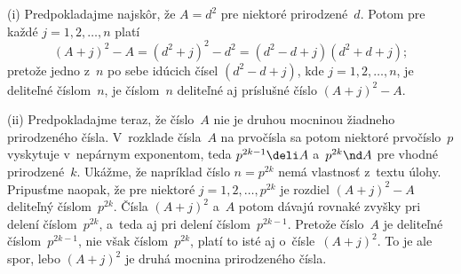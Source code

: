 {%
(i) Predpokladajme najskôr, že $A=d^2$ pre niektoré
prirodzené~$d$. Potom pre každé $j=1,2,\dots,n$ platí
$$
(A+j)^2-A=(d^2+j)^2-d^2=(d^2-d+j)(d^2+d+j);
$$
pretože jedno z~$n$ po sebe idúcich čísel $(d^2-d+j)$, kde
$j=1,2,\dots,n$, je deliteľné číslom~$n$, je číslom~$n$
deliteľné aj príslušné číslo $(A+j)^2-A$.

\smallskip
(ii) Predpokladajme teraz, že číslo~$A$ nie je druhou mocninou
žiadneho prirodzeného čísla. V~rozklade čísla~$A$ na prvočísla
sa potom niektoré prvočíslo~$p$ vyskytuje v~nepárnym exponentom,
teda $p^{2k-1}\deli A$ a~$p^{2k}\nd A$ pre vhodné prirodzené~$k$.
Ukážme, že napríklad číslo $n=p^{2k}$ nemá vlastnosť z~textu
úlohy. Pripusťme naopak, že pre niektoré $j=1,2,\dots,p^{2k}$ je
rozdiel $(A+j)^2-A$ deliteľný číslom~$p^{2k}$. Čísla $(A+j)^2$
a~$A$ potom dávajú rovnaké zvyšky pri delení číslom~$p^{2k}$,
a~teda aj pri delení číslom~$p^{2k-1}$. Pretože číslo~$A$ je
deliteľné číslom~$p^{2k-1}$, nie však číslom~$p^{2k}$, platí to isté
aj o~čísle~$(A+j)^2$. To je ale spor, lebo $(A+j)^2$ je druhá
mocnina prirodzeného čísla.}

